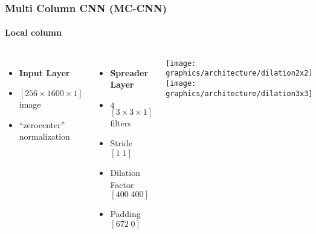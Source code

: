 \begin{frame}
    \frametitle{Multi Column CNN (MC-CNN)}
    \framesubtitle{Local column}
    \begin{columns}
            \centering
             {}
             {}
             {}
             {}
             {}
             {}
             {
                \begin{itemize}
                    \item \textbf{Input Layer}
                    \item $\left[256\times 1600\times 1\right]$ image
                    \item ``zerocenter'' normalization
                \end{itemize}
            }
             {
                \begin{itemize}
                    \item \textbf{Spreader Layer}
                    \item $4$ $\left[3\times 3\times 1\right]$ filters
                    \item Stride $\left[1\;1\right]$
                    \item Dilation Factor $\left[400\;400\right]$
                    \item Padding $\left[672\;0\right]$
                \end{itemize}
            }
             {
                \texttt{[image: graphics/architecture/dilation2x2]}
                \texttt{[image: graphics/architecture/dilation3x3]}
}
\end{columns}
\end{frame}
